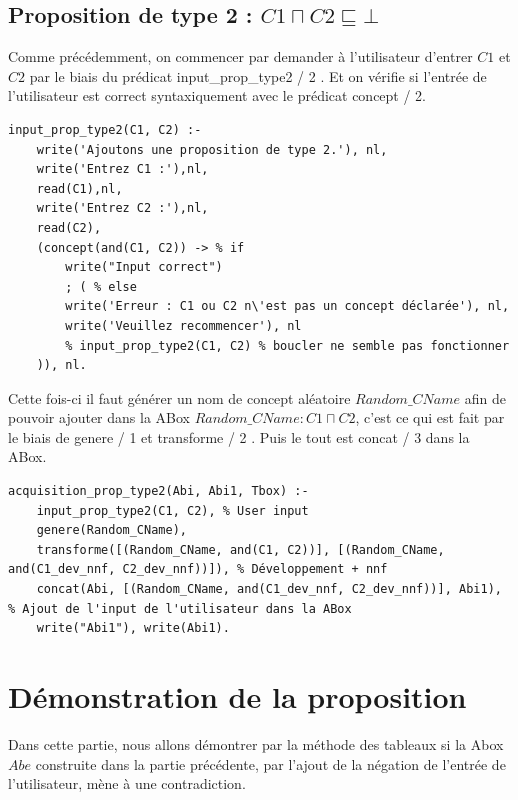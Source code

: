\documentclass{article}
\begin{document}
\subsection{Proposition de type 2 : $ C1 \sqcap C2 \sqsubseteq \bot $ }
Comme précédemment, on commencer par demander à l'utilisateur d'entrer $ C1 $ et $ C2 $ par le biais du prédicat \color{blue} input\_prop\_type2 / 2 \color{black}. Et on vérifie si l'entrée de l'utilisateur est correct syntaxiquement avec le prédicat \color{blue}concept / 2\color{black}.
\begin{verbatim}
input_prop_type2(C1, C2) :-
    write('Ajoutons une proposition de type 2.'), nl,
    write('Entrez C1 :'),nl, 
    read(C1),nl,
    write('Entrez C2 :'),nl, 
    read(C2),
    (concept(and(C1, C2)) -> % if 
        write("Input correct")
        ; ( % else
        write('Erreur : C1 ou C2 n\'est pas un concept déclarée'), nl,
        write('Veuillez recommencer'), nl
        % input_prop_type2(C1, C2) % boucler ne semble pas fonctionner
    )), nl.
\end{verbatim}
Cette fois-ci il faut générer un nom de concept aléatoire $ Random\_CName $ afin de pouvoir ajouter dans la ABox $ Random\_CName : C1 \sqcap C2 $, c'est ce qui est fait par le biais de \color{blue} genere / 1 \color{black} et \color{blue} transforme / 2 \color{black}. Puis le tout est \color{blue} concat / 3 \color{black} dans la ABox.
\begin{verbatim}
acquisition_prop_type2(Abi, Abi1, Tbox) :- 
    input_prop_type2(C1, C2), % User input
    genere(Random_CName),
    transforme([(Random_CName, and(C1, C2))], [(Random_CName, and(C1_dev_nnf, C2_dev_nnf))]), % Développement + nnf
    concat(Abi, [(Random_CName, and(C1_dev_nnf, C2_dev_nnf))], Abi1), % Ajout de l'input de l'utilisateur dans la ABox
    write("Abi1"), write(Abi1).
\end{verbatim}

\section{Démonstration de la proposition}
Dans cette partie, nous allons démontrer par la méthode des tableaux si la Abox $ Abe $ construite dans la partie précédente, par l'ajout de la négation de l'entrée de l'utilisateur, mène à une contradiction.
\end{document}
